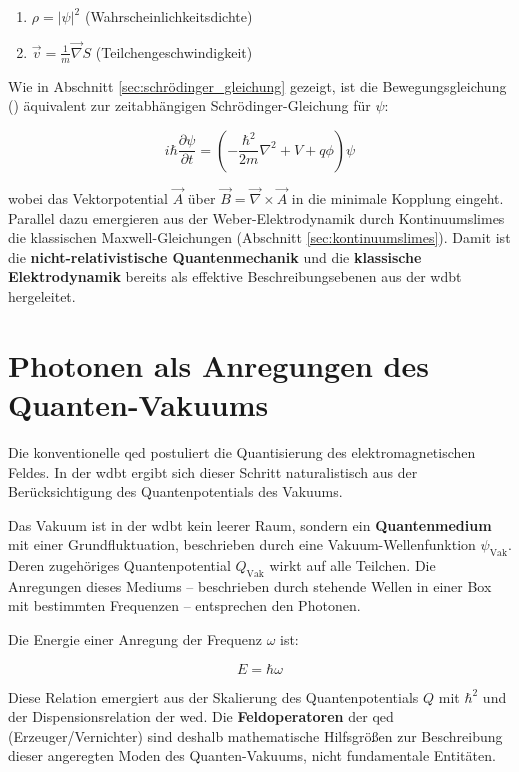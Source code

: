 \begin{enumerate}
    \item $\rho=\left| \psi \right|^2$ (Wahrscheinlichkeitsdichte)
    \item $\vec{v} = \frac{1}{m}\vec{\nabla}S$ (Teilchengeschwindigkeit)
\end{enumerate}

Wie in Abschnitt \ref{sec:schrödinger_gleichung} gezeigt, ist die Bewegungsgleichung () äquivalent zur zeitabhängigen Schrödinger-Gleichung für $\psi$:

\begin{equation}
    i\hbar \frac{\partial \psi}{\partial t} = \left( -\frac{\hbar^2}{2m} \nabla^2 + V + q\phi \right) \psi
\end{equation}

wobei das Vektorpotential $\vec{A}$ über $\vec{B} = \vec{\nabla} \times \vec{A}$ in die minimale Kopplung eingeht. Parallel dazu emergieren aus der Weber-Elektrodynamik durch Kontinuumslimes die
klassischen Maxwell-Gleichungen (Abschnitt \ref{sec:kontinuumslimes}). Damit ist die \textbf{nicht-relativistische Quantenmechanik} und die \textbf{klassische Elektrodynamik} bereits als effektive
Beschreibungsebenen aus der \gls{wdbt} hergeleitet.

\section{Photonen als Anregungen des Quanten-Vakuums}
Die konventionelle \gls{qed} postuliert die Quantisierung des elektromagnetischen Feldes. In der \gls{wdbt} ergibt sich dieser Schritt naturalistisch aus der Berücksichtigung des Quantenpotentials
des Vakuums.

Das Vakuum ist in der \gls{wdbt} kein leerer Raum, sondern ein \textbf{Quantenmedium} mit einer Grundfluktuation, beschrieben durch eine Vakuum-Wellenfunktion $\psi_\text{Vak}$. Deren zugehöriges Quantenpotential
$Q_\text{Vak}$ wirkt auf alle Teilchen. Die Anregungen dieses Mediums – beschrieben durch stehende Wellen in einer Box mit bestimmten Frequenzen – entsprechen den Photonen.

Die Energie einer Anregung der Frequenz $\omega$ ist:

\begin{equation}
    E = \hbar \omega
\end{equation}

Diese Relation emergiert aus der Skalierung des Quantenpotentials $Q$ mit $\hbar^2$ und der Dispensionsrelation der \gls{wed}. Die \textbf{Feldoperatoren} der \gls{qed} (Erzeuger/Vernichter) sind deshalb
mathematische Hilfsgrößen zur Beschreibung dieser angeregten Moden des Quanten-Vakuums, nicht fundamentale Entitäten.

